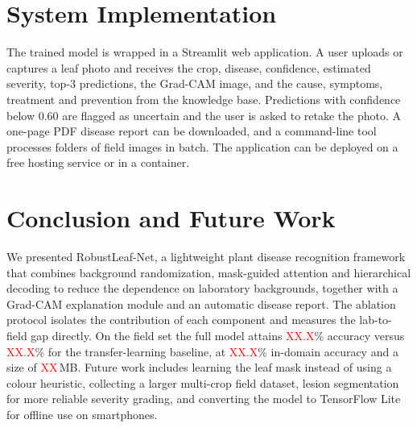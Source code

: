 \documentclass[conference]{IEEEtran}
\newcommand{\tbd}[1]{\textcolor{red}{#1}}
\newcommand{\AccIn}{\tbd{XX.X}}\newcommand{\AccField}{\tbd{XX.X}}
\newcommand{\AccFieldBase}{\tbd{XX.X}}\newcommand{\SizeMB}{\tbd{XX}}
\begin{document}
\section{System Implementation}
The trained model is wrapped in a Streamlit web application. A user uploads or captures a leaf photo and receives the crop, disease, confidence, estimated severity, top-3 predictions, the Grad-CAM image, and the cause, symptoms, treatment and prevention from the knowledge base. Predictions with confidence below 0.60 are flagged as uncertain and the user is asked to retake the photo. A one-page PDF disease report can be downloaded, and a command-line tool processes folders of field images in batch. The application can be deployed on a free hosting service or in a container.

\section{Conclusion and Future Work}
We presented RobustLeaf-Net, a lightweight plant disease recognition framework that combines background randomization, mask-guided attention and hierarchical decoding to reduce the dependence on laboratory backgrounds, together with a Grad-CAM explanation module and an automatic disease report. The ablation protocol isolates the contribution of each component and measures the lab-to-field gap directly. On the field set the full model attains \AccField\% accuracy versus \AccFieldBase\% for the transfer-learning baseline, at \AccIn\% in-domain accuracy and a size of \SizeMB\,MB. Future work includes learning the leaf mask instead of using a colour heuristic, collecting a larger multi-crop field dataset, lesion segmentation for more reliable severity grading, and converting the model to TensorFlow Lite for offline use on smartphones.

\end{document}
